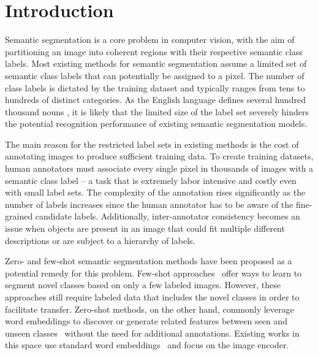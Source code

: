\section{Introduction}
\label{sec:intro}

Semantic segmentation is a core problem in computer vision, with the aim of partitioning an image into coherent regions with their respective semantic class labels. Most existing methods for semantic segmentation assume a limited set of semantic class labels that can potentially be assigned to a pixel. The number of class labels is dictated by the training dataset and typically ranges from tens \citep{Everingham15} to hundreds \citep{zhou2019semantic,mottaghi14} of distinct categories. As the English language defines several hundred thousand nouns \citep{li2020fss}, it is likely that the limited size of the label set severely hinders the potential recognition performance of existing semantic segmentation models.


The main reason for the restricted label sets in existing methods is the cost of annotating images to produce sufficient training data. To create training datasets, human annotators must associate every single pixel in thousands of images with a semantic class label -- a task that is extremely labor intensive and costly even with small label sets. The complexity of the annotation rises significantly as the number of labels increases since the human annotator has to be aware of the fine-grained candidate labels. Additionally, inter-annotator consistency becomes an issue when objects are present in an image that could fit multiple different descriptions or are subject to a hierarchy of labels.

Zero- and few-shot semantic segmentation methods have been proposed as a potential remedy for this problem.
Few-shot approaches~\citep{shaban2017one,rakelly2018conditional,siam2019amp,wang2019panet,zhang2019pyramid,nguyen2019feature,liu2020part,wang2020few,tian2020prior,boudiaf2021few,min2021hypercorrelation} offer ways to learn to segment novel classes based on only a few labeled images. However, these approaches still require labeled data that includes the novel classes in order to facilitate transfer. 
Zero-shot methods, on the other hand, commonly leverage word embeddings to discover or generate related features between seen and unseen classes~\citep{bucher2019zero,Gu2020CaGNet} without the need for additional annotations. Existing works in this space use standard word embeddings~\citep{word2vec} and focus on the image encoder.


